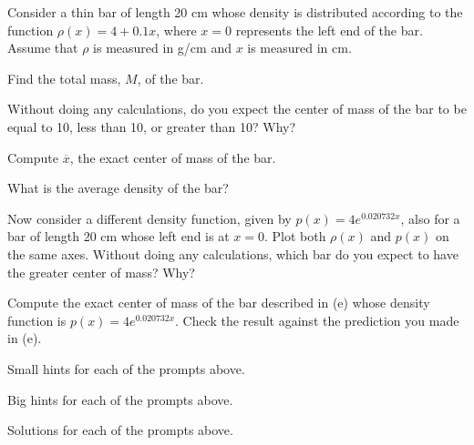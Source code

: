 \begin{activity} \label{A:6.4.3} Consider a thin bar of length 20 cm whose density is distributed according to the function $\rho(x) = 4 + 0.1x$, where $x = 0$ represents the left end of the bar.  Assume that $\rho$ is measured in g/cm and $x$ is measured in cm.
\ba
	\item Find the total mass, $M$, of the bar.
	\item Without doing any calculations, do you expect the center of mass of the bar to be equal to 10, less than 10, or greater than 10?  Why?
	\item Compute $\overline{x}$, the exact center of mass of the bar.
	\item What is the average density of the bar?  
	\item Now consider a different density function, given by $p(x) = 4e^{0.020732x}$, also for a bar of length 20 cm whose left end is at $x = 0$.  Plot both $\rho(x)$ and $p(x)$ on the same axes.  Without doing any calculations, which bar do you expect to have the greater center of mass?  Why?
	\item Compute the exact center of mass of the bar described in (e) whose density function is $p(x) = 4e^{0.020732x}$.  Check the result against the prediction you made in (e).
\ea

\end{activity}
\begin{smallhint}
\ba
	\item Small hints for each of the prompts above.
\ea
\end{smallhint}
\begin{bighint}
\ba
	\item Big hints for each of the prompts above.
\ea
\end{bighint}
\begin{activitySolution}
\ba
	\item Solutions for each of the prompts above.
\ea
\end{activitySolution}
\aftera